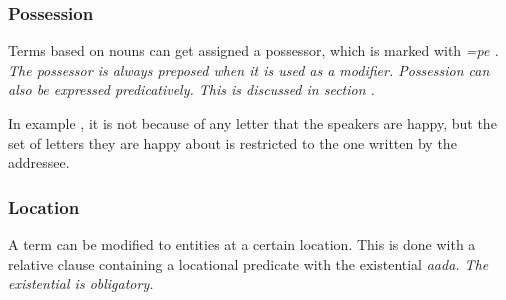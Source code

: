 \subsubsection{Possession}\label{sec:func:mod:Possession}
Terms based on nouns can get assigned a possessor, which is marked with \em =pe \em {}. The possessor is always preposed when it is used as a modifier. Possession can also be expressed predicatively. This is discussed in section .



In example , it is not because of any letter that the speakers are happy, but the set of letters they are happy about is restricted to the one written by the addressee.

\subsubsection{Location}\label{sec:func:mod:Location}
A term can be modified to entities at a certain location. This is done with a relative clause containing a locational predicate with the existential \em aada\em. The existential is obligatory.



